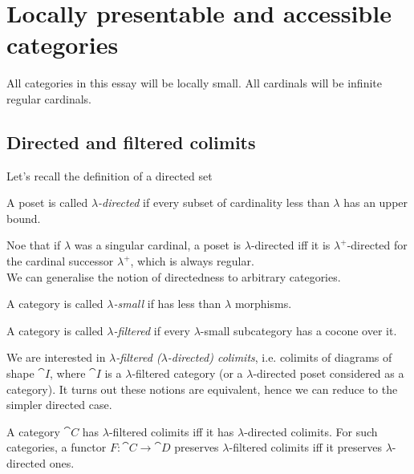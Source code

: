 \section{Locally presentable and accessible categories}
\label{sec:presentableaccessible}

All categories in this essay will be locally small. All cardinals will be infinite regular cardinals.

\subsection{Directed and filtered colimits}

Let's recall the definition of a directed set
\begin{Definition}
A poset is called \emph{$\lambda$-directed} if every subset of cardinality less than $\lambda$ has an upper bound.
\end{Definition}
Noe that if $\lambda$ was a singular cardinal, a poset is $\lambda$-directed iff it is $\lambda^+$-directed for the cardinal successor $\lambda^+$, which is always regular. \\

We can generalise the notion of directedness to arbitrary categories.

\begin{Definition}
A category is called \emph{$\lambda$-small} if has less than $\lambda$ morphisms.
\end{Definition}

\begin{Definition}
A category is called \emph{$\lambda$-filtered} if every $\lambda$-small subcategory has a cocone over it. 
\end{Definition}

We are interested in \emph{$\lambda$-filtered ($\lambda$-directed) colimits}, i.e. colimits of diagrams of shape $\cat I$, where $\cat I$ is a $\lambda$-filtered category (or a $\lambda$-directed poset considered as a category). It turns out these notions are equivalent, hence we can reduce to the simpler directed case.

\begin{Proposition}A category $\cat C$ has $\lambda$-filtered colimits iff it has $\lambda$-directed colimits. For such categories, a functor $F : \cat C \to \cat D$ preserves $\lambda$-filtered colimits iff it preserves $\lambda$-directed ones.
\end{Proposition}

